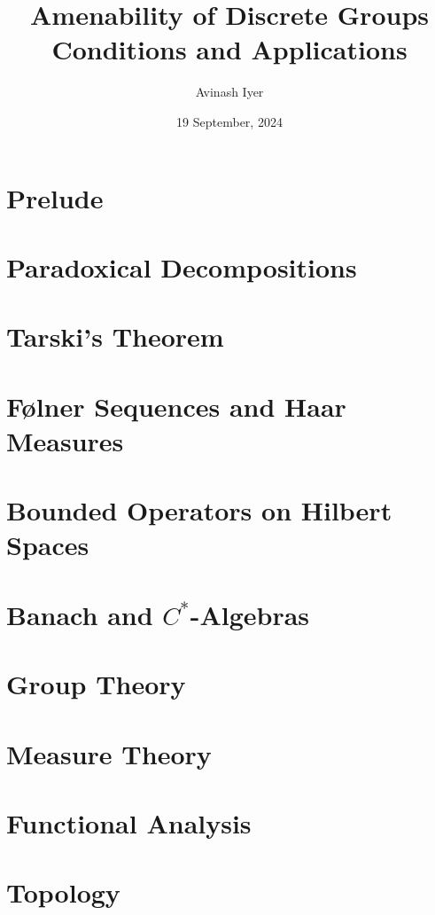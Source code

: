 \documentclass[12pt]{package2}
\title{Amenability of Discrete Groups\\ {\large Conditions and Applications}}
\author{Avinash Iyer}
\date{19 September, 2024}
\begin{document}
\maketitle
\tableofcontents
\chapter{Prelude}
\chapter{Paradoxical Decompositions}
\chapter{Tarski's Theorem}
\chapter{Følner Sequences and Haar Measures}
\chapter{Bounded Operators on Hilbert Spaces}
\chapter{Banach and $C^{\ast}$-Algebras}
\appendix
\chapter{Group Theory}
\chapter{Measure Theory}
\chapter{Functional Analysis}
\chapter{Topology}
\end{document}
